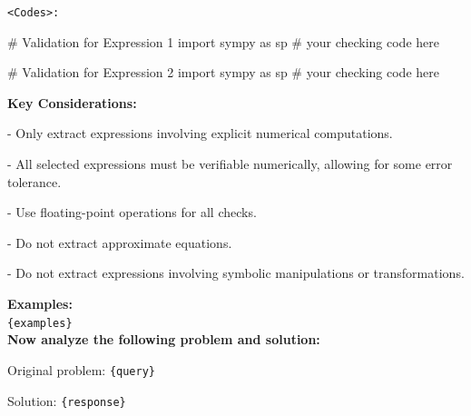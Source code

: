 \begin{textcolorbox}
\texttt{<Codes>:}
\begin{codebox}
# Validation for Expression 1
import sympy as sp
# your checking code here

# Validation for Expression 2
import sympy as sp
# your checking code here
\end{codebox}


\textbf{Key Considerations:}

\quad- Only extract expressions involving explicit numerical computations.

\quad- All selected expressions must be verifiable numerically, allowing for some error tolerance.

\quad- Use floating-point operations for all checks.

\quad- Do not extract approximate equations.

\quad- Do not extract expressions involving symbolic manipulations or transformations.

\textbf{Examples:}\\
\texttt{\{examples\}} \\

\textbf{Now analyze the following problem and solution:}

Original problem:
\texttt{\{query\}}

Solution:
\texttt{\{response\}}
\end{textcolorbox}

